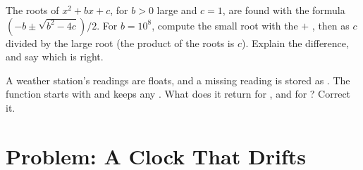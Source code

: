 \begin{exercise}[$\star\star\star$]\label{exo:g10:floating-point:14}
The roots of $x^2 + bx + c$, for $b > 0$ large and $c = 1$, are found with the formula
$\left(-b \pm \sqrt{b^2 - 4c}\right)/2$. For $b = 10^8$, compute the small root with the $+$ , then as
$c$ divided by the large root (the product of the roots is $c$). Explain the difference, and say which is right.
\end{exercise}

\begin{exercise}[$\star\star\star$]\label{exo:g10:floating-point:15}
A weather station's readings are floats, and a missing reading is stored as . The function
 starts with  and keeps any . What does it return for
\code{[nan, 3.0, 7.0]}, and for \code{[3.0, nan, 7.0]}? Correct it.
\end{exercise}

\section{Problem: A Clock That Drifts}\label{sec:g10:floating-point:problem}

